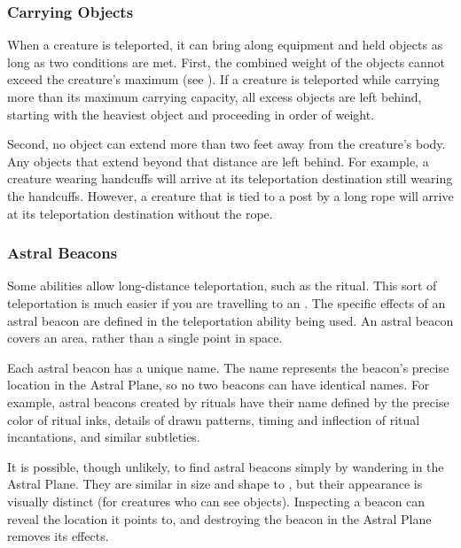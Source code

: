     \subsubsection{Carrying Objects}
      When a creature is teleported, it can bring along equipment and held objects as long as two conditions are met.
      First, the combined weight of the objects cannot exceed the creature's maximum  (see ).
      If a creature is teleported while carrying more than its maximum carrying capacity, all excess objects are left behind, starting with the heaviest object and proceeding in order of weight.

      Second, no object can extend more than two feet away from the creature's body.
      Any objects that extend beyond that distance are left behind.
      For example, a creature wearing handcuffs will arrive at its teleportation destination still wearing the handcuffs.
      However, a creature that is tied to a post by a long rope will arrive at its teleportation destination without the rope.

    \subsubsection{Astral Beacons}\label{Astral Beacons}
      Some abilities allow long-distance teleportation, such as the  ritual.
      This sort of teleportation is much easier if you are travelling to an .
      The specific effects of an astral beacon are defined in the teleportation ability being used.
      An astral beacon covers an area, rather than a single point in space.

      Each astral beacon has a unique name.
      The name represents the beacon's precise location in the Astral Plane, so no two beacons can have identical names.
      For example, astral beacons created by rituals have their name defined by the precise color of ritual inks, details of drawn patterns, timing and inflection of ritual incantations, and similar subtleties.

      It is possible, though unlikely, to find astral beacons simply by wandering in the Astral Plane.
      They are similar in size and shape to , but their appearance is visually distinct (for creatures who can see  objects).
      Inspecting a beacon can reveal the location it points to, and destroying the beacon in the Astral Plane removes its effects.

